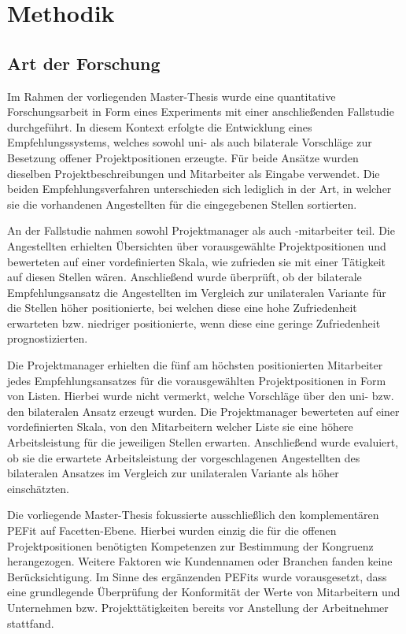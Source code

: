 \chapter{Methodik}
\label{ch:methodik}

\section{Art der Forschung}
\label{ch:methodik:art}
Im Rahmen der vorliegenden Master-Thesis wurde eine quantitative Forschungsarbeit in Form eines Experiments mit einer anschließenden Fallstudie durchgeführt. In diesem Kontext erfolgte die Entwicklung eines Empfehlungssystems, welches sowohl uni- als auch bilaterale Vorschläge zur Besetzung offener Projektpositionen erzeugte. Für beide Ansätze wurden dieselben Projektbeschreibungen und Mitarbeiter als Eingabe verwendet. Die beiden Empfehlungsverfahren unterschieden sich lediglich in der Art, in welcher sie die vorhandenen Angestellten für die eingegebenen Stellen sortierten.

An der Fallstudie nahmen sowohl Projektmanager als auch -mitarbeiter teil. Die Angestellten erhielten Übersichten über vorausgewählte Projektpositionen und bewerteten auf einer vordefinierten Skala, wie zufrieden sie mit einer Tätigkeit auf diesen Stellen wären. Anschließend wurde überprüft, ob der bilaterale Empfehlungsansatz die Angestellten im Vergleich zur unilateralen Variante für die Stellen höher positionierte, bei welchen diese eine hohe Zufriedenheit erwarteten bzw. niedriger positionierte, wenn diese eine geringe Zufriedenheit prognostizierten.

Die Projektmanager erhielten die fünf am höchsten positionierten Mitarbeiter jedes Empfehlungsansatzes für die vorausgewählten Projektpositionen in Form von Listen. Hierbei wurde nicht vermerkt, welche Vorschläge über den uni- bzw. den bilateralen Ansatz erzeugt wurden. Die Projektmanager bewerteten auf einer vordefinierten Skala, von den Mitarbeitern welcher Liste sie eine höhere Arbeitsleistung für die jeweiligen Stellen erwarten. Anschließend wurde evaluiert, ob sie die erwartete Arbeitsleistung der vorgeschlagenen Angestellten des bilateralen Ansatzes im Vergleich zur unilateralen Variante als höher einschätzten.

Die vorliegende Master-Thesis fokussierte ausschließlich den komplementären \ac{PEFit} auf Facetten-Ebene. Hierbei wurden einzig die für die offenen Projektpositionen benötigten Kompetenzen zur Bestimmung der Kongruenz herangezogen. Weitere Faktoren wie Kundennamen oder Branchen fanden keine Berücksichtigung. Im Sinne des ergänzenden \acp{PEFit} wurde vorausgesetzt, dass eine grundlegende Überprüfung der Konformität der Werte von Mitarbeitern und Unternehmen bzw. Projekttätigkeiten bereits vor Anstellung der Arbeitnehmer stattfand.

